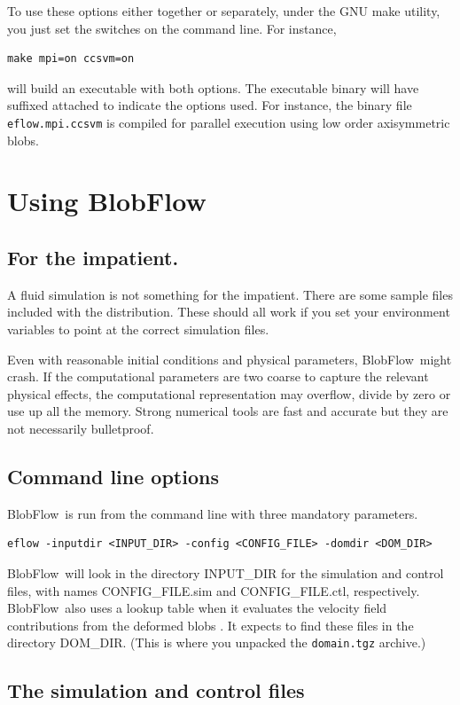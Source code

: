 \documentclass[12pt]{report}
\newcommand{\BF}{BlobFlow}
\begin{document}
To use these options either together or separately, under the GNU make
utility, you just set the switches on the command line. For instance,
\begin{verbatim}
make mpi=on ccsvm=on
\end{verbatim}
will build an executable with both options.  The executable binary will have
suffixed attached to indicate the options used.  For instance, the binary file
{\tt eflow.mpi.ccsvm} is compiled for parallel execution using low order
axisymmetric blobs.

\chapter{Using \BF}

\section{For the impatient.}

A fluid simulation is not something for the impatient.  There are some
sample files included with the distribution.  These should all work if you
set your environment variables to point at the correct simulation files.

Even with reasonable initial conditions and physical
parameters,
\BF~might crash.  If the computational parameters
are two coarse to capture the relevant physical effects, the computational
representation may overflow, divide by zero or use up all the memory.
Strong numerical tools are fast and accurate but they are not necessarily 
bulletproof.

\section{Command line options}

\BF~is run from the command line with three mandatory parameters.
\begin{verbatim}
eflow -inputdir <INPUT_DIR> -config <CONFIG_FILE> -domdir <DOM_DIR>
\end{verbatim}
\BF~will look in the directory INPUT\_DIR for the simulation and control files,
with names CONFIG\_FILE.sim and CONFIG\_FILE.ctl, respectively.  \BF~also uses a
lookup table when it evaluates the velocity field contributions from the
deformed blobs \cite{platte-rossi-mitchell}.  It expects to find these files in
the directory DOM\_DIR.  (This is where you unpacked the \texttt{domain.tgz}
archive.)

\section{The simulation and control files}
\end{document}
